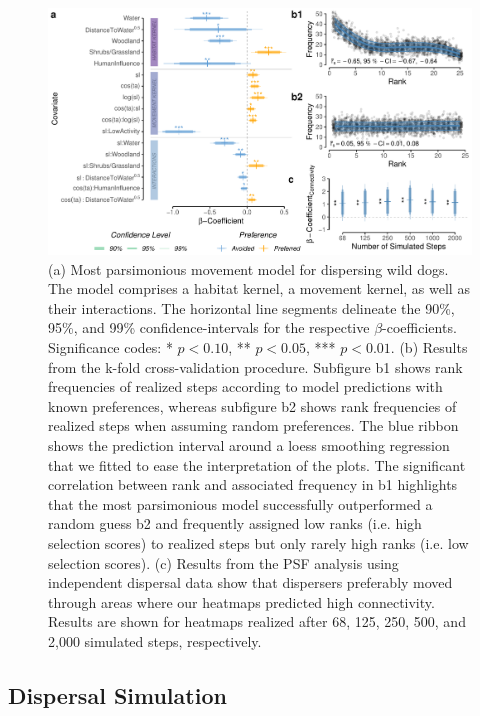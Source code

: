 \documentclass[../FinalThesis.tex]{subfiles}
\begin{document}
\begin{figure}[htpb]
  \begin{center}
    \includegraphics[width=\textwidth]{Figures/MovementModel} \caption{(a) Most
    parsimonious movement model for dispersing wild dogs. The model comprises a
    habitat kernel, a movement kernel, as well as their interactions. The
    horizontal line segments delineate the 90\%, 95\%, and 99\%
    confidence-intervals for the respective \(\beta\)-coefficients. Significance
    codes: * \(p < 0.10\), ** \(p < 0.05\), *** \(p < 0.01\). (b) Results from
    the k-fold cross-validation procedure. Subfigure b1 shows rank frequencies
    of realized steps according to model predictions with known preferences,
    whereas subfigure b2 shows rank frequencies of realized steps when assuming
    random preferences. The blue ribbon shows the prediction interval around a
    loess smoothing regression that we fitted to ease the interpretation of the
    plots. The significant correlation between rank and associated frequency in
    b1 highlights that the most parsimonious model successfully outperformed a
    random guess b2 and frequently assigned low ranks (i.e. high selection
    scores) to realized steps but only rarely high ranks (i.e. low selection
    scores). (c) Results from the PSF analysis using independent dispersal data
    show that dispersers preferably moved through areas where our heatmaps
    predicted high connectivity. Results are shown for heatmaps realized after
    68, 125, 250, 500, and 2,000 simulated steps, respectively.}
    \label{MovementModel}
  \end{center}
\end{figure}

\subsection{Dispersal Simulation}
\end{document}
